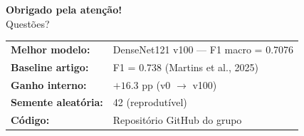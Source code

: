 \documentclass[aspectratio=169]{beamer}
\begin{document}
\begin{frame}[plain]
  \begin{center}
    \vspace{1.5em}
    {\LARGE\textbf{Obrigado pela atenção!}}\\[1.2em]
    \large Questões?\\[2em]
    \begin{tabular}{ll}
      \textbf{Melhor modelo:}  & DenseNet121 v100 --- F1 macro = 0.7076 \\[4pt]
      \textbf{Baseline artigo:} & F1 = 0.738 (Martins et al., 2025) \\[4pt]
      \textbf{Ganho interno:}  & $+16.3$ pp (v0 $\to$ v100) \\[4pt]
      \textbf{Semente aleatória:} & 42 (reprodutível) \\[4pt]
      \textbf{Código:} & Repositório GitHub do grupo \\
    \end{tabular}
  \end{center}
\end{frame}
\end{document}
